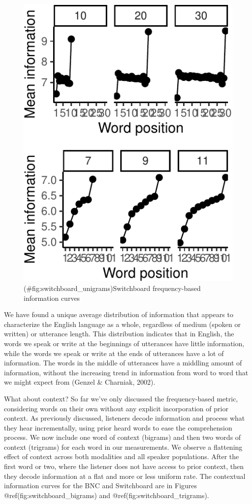 \documentclass[man,floatsintext]{apa6}
\begin{document}
\begin{figure}
\centering
\includegraphics{figs/switchboard_unigrams-1.pdf}
\caption{(\#fig:switchboard\_unigrams)Switchboard frequency-based information curves}
\end{figure}

We have found a unique average distribution of information that appears to characterize the English language as a whole, regardless of medium (spoken or written) or utterance length. This distribution indicates that in English, the words we speak or write at the beginnings of utterances have little information, while the words we speak or write at the ends of utterances have a lot of information. The words in the middle of utterances have a middling amount of information, without the increasing trend in information from word to word that we might expect from (Genzel \& Charniak, 2002).

What about context? So far we've only discussed the frequency-based metric, considering words on their own without any explicit incorporation of prior context. As previously discussed, listeners decode information and process what they hear incrementally, using prior heard words to ease the comprehension process. We now include one word of context (bigrams) and then two words of context (trigrams) for each word in our measurements. We observe a flattening effect of context across both modalities and all speaker populations. After the first word or two, where the listener does not have access to prior context, then they decode information at a flat and more or less uniform rate. The contextual information curves for the BNC and Switchboard are in Figures @ref(fig:switchboard\_bigrams) and @ref(fig:switchboard\_trigrams).
\end{document}
